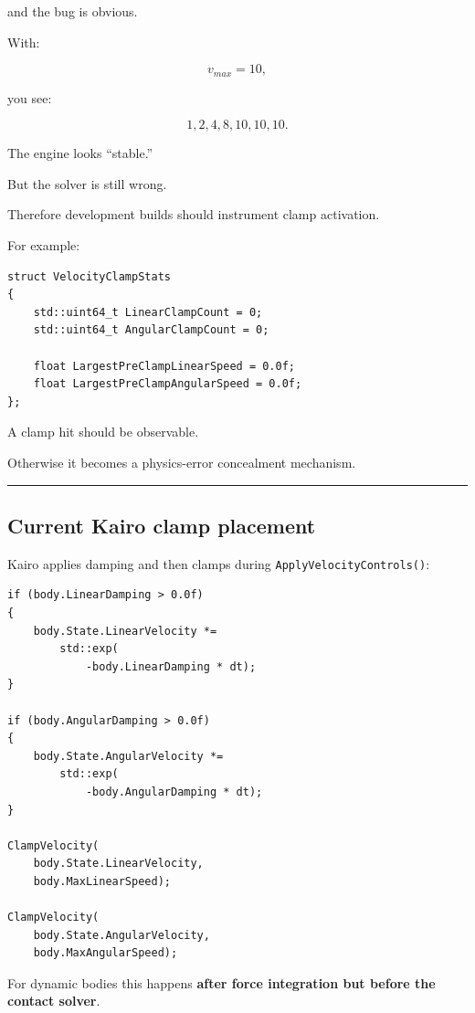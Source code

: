 and the bug is obvious.

With:

\[
v_{max}=10,
\]

you see:

\[
1,2,4,8,10,10,10.
\]

The engine looks ``stable.''

But the solver is still wrong.

Therefore development builds should instrument clamp activation.

For example:

\begin{verbatim}
struct VelocityClampStats
{
    std::uint64_t LinearClampCount = 0;
    std::uint64_t AngularClampCount = 0;

    float LargestPreClampLinearSpeed = 0.0f;
    float LargestPreClampAngularSpeed = 0.0f;
};
\end{verbatim}

A clamp hit should be observable.

Otherwise it becomes a physics-error concealment mechanism.

\begin{center}\rule{0.5\linewidth}{0.5pt}\end{center}

\subsection{Current Kairo clamp placement}\label{06-engine-ii-ch038-current-kairo-clamp-placement}

\hypertarget{06-engine-ii-ch038-current-kairo-clamp-placement}{}

Kairo applies damping and then clamps during \texttt{ApplyVelocityControls()}:

\begin{verbatim}
if (body.LinearDamping > 0.0f)
{
    body.State.LinearVelocity *=
        std::exp(
            -body.LinearDamping * dt);
}

if (body.AngularDamping > 0.0f)
{
    body.State.AngularVelocity *=
        std::exp(
            -body.AngularDamping * dt);
}

ClampVelocity(
    body.State.LinearVelocity,
    body.MaxLinearSpeed);

ClampVelocity(
    body.State.AngularVelocity,
    body.MaxAngularSpeed);
\end{verbatim}

For dynamic bodies this happens \textbf{after force integration but before the contact solver}.

